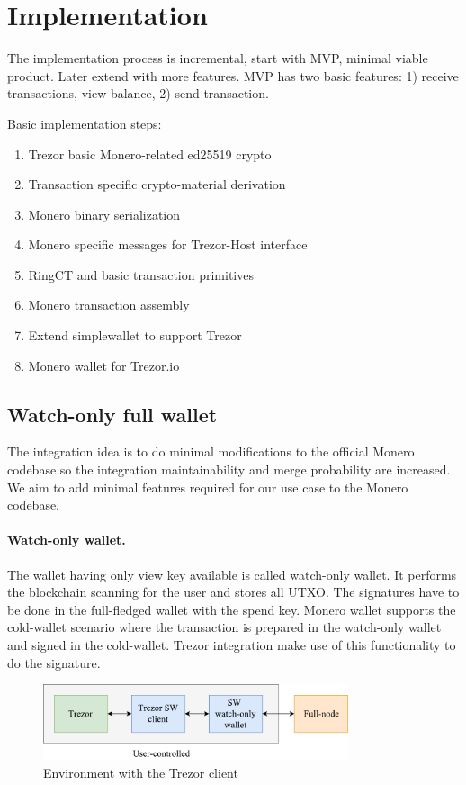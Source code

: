 \documentclass[]{article}
\begin{document}
\section{Implementation}

The implementation process is incremental, start with MVP, minimal viable product. Later extend with more features. MVP has two basic features: 1) receive transactions, view balance, 2) send transaction. 

\;
\noindent Basic implementation steps:
\begin{enumerate}
	\item Trezor basic Monero-related ed25519 crypto
	\item Transaction specific crypto-material derivation
	\item Monero binary serialization
	\item Monero specific messages for Trezor-Host interface
	\item RingCT and basic transaction primitives
	\item Monero transaction assembly
	\item Extend simplewallet to support Trezor
	\item Monero wallet for Trezor.io 
\end{enumerate}

\subsection{Watch-only full wallet}
The integration idea is to do minimal modifications to the official Monero codebase so the integration maintainability and merge probability are increased. We aim to add minimal features required for our use case to the Monero codebase. 

\paragraph{Watch-only wallet.} 
The wallet having only view key available is called watch-only wallet. It performs the blockchain scanning for the user and stores all UTXO. The signatures have to be done in the full-fledged wallet with the spend key. 
Monero wallet supports the cold-wallet scenario where the transaction is prepared in the watch-only wallet and signed in the cold-wallet. Trezor integration make use of this functionality to do the signature.

\begin{figure}[h]
	\centering
	\includegraphics[width=0.8\textwidth, angle=0]{trezor-int.pdf}
	\caption{Environment with the Trezor client}
\end{figure}
\end{document}
